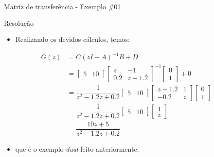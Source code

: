 \begin{frame}{Matriz de transferência - Exemplo \#01}
\begin{block}{Resolução}
\begin{itemize}
    \item Realizando os devidos cálculos, temos:
\end{itemize}
\begin{align*}
    G(z) &= C(zI - A)^{-1} B + D \\
    &= \begin{bmatrix}
    5 & 10
    \end{bmatrix}
    \begin{bmatrix}
    z & -1 \\ \num{0,2} & z-\num{1,2}
    \end{bmatrix}^{-1} 
    \begin{bmatrix}
    0 \\ 1
    \end{bmatrix}
    + 0 \\
    &= \dfrac{1}{z^2-\num{1,2}z+\num{0,2}}
    \begin{bmatrix}
    5 & 10
    \end{bmatrix}
    \begin{bmatrix}
    z-\num{1,2} & 1 \\ -\num{0,2} & z
    \end{bmatrix}
    \begin{bmatrix}
    0 \\ 1
    \end{bmatrix} \\
    &= \dfrac{1}{z^2-\num{1,2}z+\num{0,2}}
    \begin{bmatrix}
    5 & 10
    \end{bmatrix}
    \begin{bmatrix}
    1 \\ z
    \end{bmatrix} \\
    &= \dfrac{10z+5}{z^2-\num{1,2}z+\num{0,2}}
\end{align*}
\vspace{-0.3cm}
\begin{itemize}
    \item[] que é o exemplo \textit{dual} feito anteriormente.
\end{itemize}
\end{block}
\end{frame}

